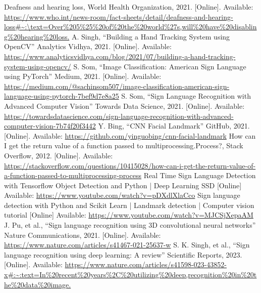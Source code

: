 \documentclass[../paper.tex]{subfiles}
\begin{document}
    \begin{thebibliography}{00}
         Deafness and hearing loss, World Health Organization, 2021.
        [Online].
        Available: \url{https://www.who.int/news-room/fact-sheets/detail/deafness-and-hearing-loss\#\~:\text=Over\%205\%25\%20of\%20the\%20world\%27s,will\%20have\%20disabling\%20hearing\%20loss.}
        A. Singh, ``Building a Hand Tracking System using OpenCV'' Analytics Vidhya, 2021.
        [Online].
        Available: \url{https://www.analyticsvidhya.com/blog/2021/07/building-a-hand-tracking-system-using-opencv/}
         S. Som, ``Image Classification: American Sign Language using PyTorch'' Medium, 2021.
        [Online].
        Available: \url{https://medium.com/@sachinsom507/image-classification-american-sign-language-using-pytorch-7bef9d7e8a25}
         S. Som, ``Sign Language Recognition with Advanced Computer Vision'' Towards Data Science, 2021.
        [Online].
        Available: \url{https://towardsdatascience.com/sign-language-recognition-with-advanced-computer-vision-7b74f20f3442}
         Y. Bing, ``CNN Facial Landmark'' GitHub, 2021.
        [Online].
        Available: \url{https://github.com/yinguobing/cnn-facial-landmark}
         How can I get the return value of a function passed to multiprocessing.Process?,
        Stack Overflow, 2012.
        [Online].
        Available:
        \url{https://stackoverflow.com/questions/10415028/how-can-i-get-the-return-value-of-a-function-passed-to-multiprocessing-process}
         Real Time Sign Language Detection with Tensorflow Object Detection and Python | Deep Learning SSD
        [Online]
        Available: \url{https://www.youtube.com/watch?v=pDXdlXlaCco}
        Sign language detection with Python and Scikit Learn | Landmark detection | Computer vision tutorial
        [Online]
        Available: \url{https://www.youtube.com/watch?v=MJCSjXepaAM}
         J. Pu, et al., ``Sign language recognition using 3D convolutional neural networks'' Nature Communications, 2021.
        [Online].
        Available: \url{https://www.nature.com/articles/s41467-021-25637-w}
         S. K. Singh, et al., ``Sign language recognition using deep learning: A review'' Scientific Reports, 2023.
        [Online].
        Available: \url{https://www.nature.com/articles/s41598-023-43852-x#:~:text=In%20recent%20years%2C%20utilizing%20deep,recognition%20in%20the%20data%20image.}

\end{thebibliography}
\end{document}
